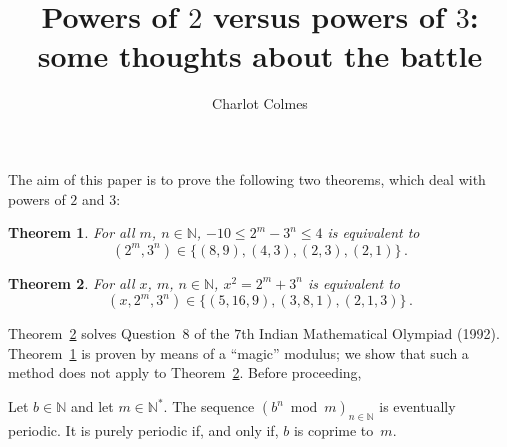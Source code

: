 \documentclass[12pt]{article}
\newcommand{\bN}{\mathbb{N}} %
\newcommand{\bNast}{\bN^*}
\newtheorem{theorem}{Theorem}
\theoremstyle{definition}
\begin{document}
 \title{Powers of $2$ versus powers of $3$: some thoughts about the battle}
 \author{Charlot Colmes}
 \maketitle 


 The aim of this paper is to prove the following two theorems, which deal with powers of $2$ and $3$:

   \begin{theorem} \label{thm:2m-moins-3n}
     For all $m$, $n \in \bN$,
     $- 10 \le 2^m - 3^n  \le 4$ is equivalent to
     $$(2^m, 3^n) \in \{ (8, 9), (4, 3), (2, 3), (2, 1)  \} \, .
     $$
   \end{theorem}

   
   \begin{theorem} \label{thm:IndMO}
     For all $x$, $m$, $n \in \bN$,
     $x^2 = 2^m + 3^n$ is equivalent to
     $$
     (x, 2^m, 3^n) \in \{  (5, 16, 9), (3, 8, 1), (2, 1, 3) \} \, .
     $$
   \end{theorem}

   Theorem~\ref{thm:IndMO} solves Question~$8$ of the $7$th Indian Mathematical Olympiad (1992).
   Theorem~\ref{thm:2m-moins-3n} is proven by means of a ``magic'' modulus;
   we show that such a method does not apply to Theorem~\ref{thm:IndMO}. 
   Before proceeding,

   Let $b \in \bN$ and let $m \in \bNast$.
   The sequence $\left( b^n \bmod m \right)_{n \in \bN}$ is eventually periodic.
   It is purely periodic if, and only if, $b$ is coprime to~$m$.
   
\end{document}
